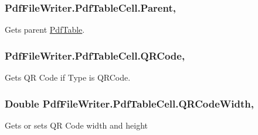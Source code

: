 \subsubsection[{\texorpdfstring{Parent}{Parent}}]{ Pdf\+File\+Writer.\+Pdf\+Table\+Cell.\+Parent\hspace{0.3cm}{\ttfamily [get]}, {\ttfamily [set]}}\hypertarget{class_pdf_file_writer_1_1_pdf_table_cell_a0e65638e93396abb8b75ffc97c4ad032}{}\label{class_pdf_file_writer_1_1_pdf_table_cell_a0e65638e93396abb8b75ffc97c4ad032}


Gets parent \hyperlink{class_pdf_file_writer_1_1_pdf_table}{Pdf\+Table}. 

\subsubsection[{\texorpdfstring{Q\+R\+Code}{QRCode}}]{ Pdf\+File\+Writer.\+Pdf\+Table\+Cell.\+Q\+R\+Code\hspace{0.3cm}{\ttfamily [get]}, {\ttfamily [set]}}\hypertarget{class_pdf_file_writer_1_1_pdf_table_cell_a940f638dbb778196bc36633e9e64af26}{}\label{class_pdf_file_writer_1_1_pdf_table_cell_a940f638dbb778196bc36633e9e64af26}


Gets QR Code if Type is Q\+R\+Code. 

\subsubsection[{\texorpdfstring{Q\+R\+Code\+Width}{QRCodeWidth}}]{\setlength{\rightskip}{0pt plus 5cm}Double Pdf\+File\+Writer.\+Pdf\+Table\+Cell.\+Q\+R\+Code\+Width\hspace{0.3cm}{\ttfamily [get]}, {\ttfamily [set]}}\hypertarget{class_pdf_file_writer_1_1_pdf_table_cell_aa61ba83535799b3b3fad3705becc5727}{}\label{class_pdf_file_writer_1_1_pdf_table_cell_aa61ba83535799b3b3fad3705becc5727}


Gets or sets QR Code width and height 

